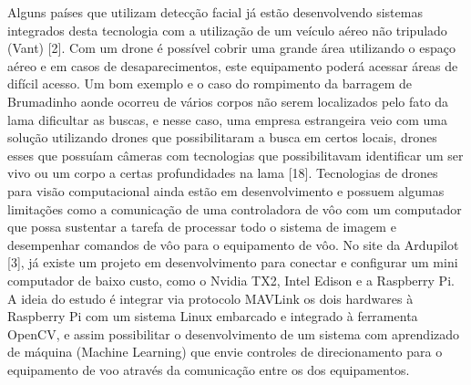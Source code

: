 Alguns países que utilizam detecção facial já estão desenvolvendo sistemas integrados desta tecnologia com a utilização de um veículo aéreo não tripulado (Vant) [2]. Com um drone é possível cobrir uma grande área utilizando o espaço aéreo e em casos de desaparecimentos, este equipamento poderá acessar áreas de difícil acesso. Um bom exemplo e o caso do rompimento da barragem de Brumadinho aonde ocorreu de vários corpos não serem localizados pelo fato da lama dificultar as buscas, e nesse caso, uma empresa estrangeira veio com uma solução utilizando drones que possibilitaram a busca em certos locais, drones esses que possuíam câmeras com tecnologias que possibilitavam identificar um ser vivo ou um corpo a certas profundidades na lama [18].  
Tecnologias de drones para visão computacional ainda estão em desenvolvimento e possuem algumas limitações como a comunicação de uma controladora de vôo com um computador que possa sustentar a tarefa de processar todo o sistema de imagem e desempenhar comandos de vôo para o equipamento de vôo.
No site da Ardupilot [3], já existe um projeto em desenvolvimento para conectar e configurar um mini computador de baixo custo, como o Nvidia TX2, Intel Edison e a Raspberry Pi. A ideia do estudo é integrar via protocolo MAVLink os dois hardwares à Raspberry Pi com um sistema Linux embarcado e integrado à ferramenta OpenCV, e assim possibilitar o desenvolvimento de um sistema com aprendizado de máquina (Machine Learning) que envie controles de direcionamento para o equipamento de voo através da comunicação entre os dos equipamentos.  






